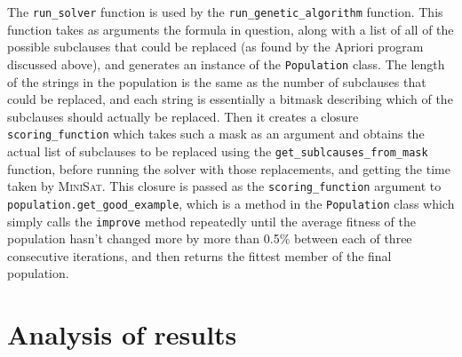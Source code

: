 \documentclass[proof,pdftex,11pt,a4]{article}
\def\code{\lstinline[basicstyle=\textsize\ttfamily]}
\begin{document}
The \code{run_solver} function is used by the \code{run_genetic_algorithm} function. This function takes as arguments the formula in question, along with a list of all of the possible subclauses that could be replaced (as found by the Apriori program discussed above), and generates an instance of the \code{Population} class. The length of the strings in the population is the same as the number of subclauses that could be replaced, and each string is essentially a bitmask describing which of the subclauses should actually be replaced. Then it creates a closure \code{scoring_function} which takes such a mask as an argument and obtains the actual list of subclauses to be replaced using the \code{get_sublcauses_from_mask} function, before running the solver with those replacements, and getting the time taken by \textsc{MiniSat}. This closure is passed as the \code{scoring_function} argument to \code{population.get_good_example}, which is a method in the \code{Population} class which simply calls the \code{improve} method repeatedly until the average fitness of the population hasn't changed more by more than 0.5\% between each of three consecutive iterations, and then returns the fittest member of the final population.

\section{Analysis of results}
\end{document}
